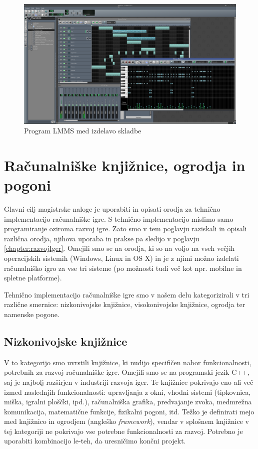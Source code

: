 \documentclass[12pt,a4paper,twoside]{book}
\begin{document}
\begin{figure}[h]
	\centering
	\includegraphics[width=12cm]{lmms}
	\caption{Program LMMS med izdelavo skladbe}
	\label{slika:lmms}
\end{figure}

\section{Računalniške knjižnice, ogrodja in pogoni}
Glavni cilj magistrske naloge je uporabiti in opisati orodja za tehnično implementacijo računalniške igre. S tehnično implementacijo mislimo samo programiranje oziroma razvoj igre. Zato smo v tem poglavju raziskali in opisali različna orodja, njihova uporaba in prakse pa sledijo v poglavju \ref{chapter:razvojIger}. Omejili smo se na orodja, ki so na voljo na vseh večjih operacijskih sistemih (Windows, Linux in OS X) in je z njimi možno izdelati računalniško igro za vse tri sisteme (po možnosti tudi več kot npr. mobilne in spletne platforme).

Tehnično implementacijo računalniške igre smo v našem delu kategorizirali v tri različne smernice: nizkonivojske knjižnice, visokonivojske knjižnice, ogrodja ter namenske pogone.

\subsection{Nizkonivojske knjižnice}
V to kategorijo smo uvrstili knjižnice, ki nudijo specifičen nabor funkcionalnosti, potrebnih za razvoj računalniške igre. Omejili smo se na programski jezik C++, saj je najbolj razširjen v industriji razvoja iger. Te knjižnice pokrivajo eno ali več izmed naslednjih funkcionalnosti: upravljanja z okni, vhodni sistemi (tipkovnica, miška, igralni ploščki, ipd.), računalniška grafika, predvajanje zvoka, medmrežna komunikacija, matematične funkcije, fizikalni pogoni, itd. Težko je definirati mejo med knjižnico in ogrodjem (angleško \textit{framework}), vendar v splošnem knjižnice v tej kategoriji ne pokrivajo vse potrebne funkcionalnosti za razvoj. Potrebno je uporabiti kombinacijo le-teh, da uresničimo končni projekt.
\end{document}
